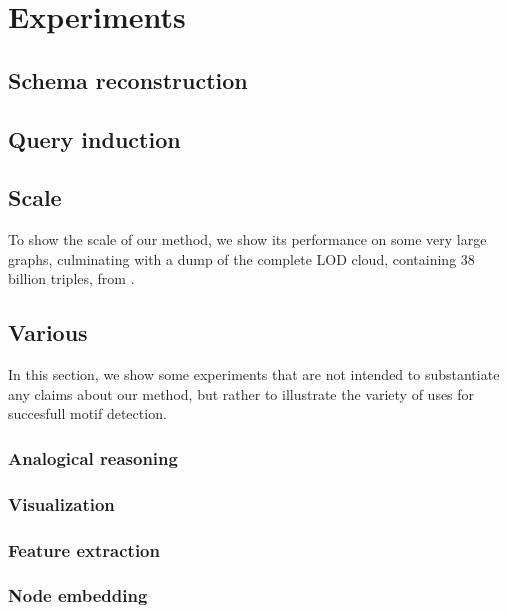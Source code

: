 \documentclass[11pt]{article}
\begin{document}
\section{Experiments}



\subsection{Schema reconstruction}

\subsection{Query induction}

\subsection{Scale}

To show the scale of our method, we show its performance on some very large graphs, culminating with a dump of the complete LOD cloud, containing 38 billion triples, from \cite{}.

\subsection{Various}


In this section, we show some experiments that are not intended to substantiate any claims about our method, but rather to illustrate the variety of uses for succesfull motif detection. 

\subsubsection{Analogical reasoning}

\subsubsection{Visualization}

\subsubsection{Feature extraction}

\subsubsection{Node embedding}


\end{document}
